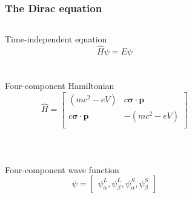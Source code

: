 \documentclass[mathserif,10pt]{beamer}
\begin{document}
\begin{frame}
    \frametitle{The Dirac equation}
    \begin{columns}
    \begin{column}{.60\textwidth}
	\centering
	Time-independent equation
	\begin{equation}
	    \nonumber
	    \hat{H} \psi = E \psi
	\end{equation}
	\ \\
	\ \\
	Four-component Hamiltonian
	\begin{equation}
	    \nonumber
	    \hat{H} = 
	    \begin{bmatrix}
		(mc^2 - eV) & c\boldsymbol{\sigma}\cdot\boldsymbol{p}\\
		c\boldsymbol{\sigma}\cdot\boldsymbol{p} & -(mc^2 - eV)\\
	    \end{bmatrix}
	\end{equation}
	\ \\
	\ \\
	\ \\
	Four-component wave function
	\begin{equation}
	    \nonumber
	    \psi = 
	    \begin{bmatrix}
		\psi_\alpha^L,
		\psi_\beta^L,
		\psi_\alpha^S, 
		\psi_\beta^S 
	    \end{bmatrix}
	\end{equation}
    \end{column}
    \begin{column}{.40\textwidth}
	\centering

\end{column}
\end{columns}
\end{frame}
\end{document}
